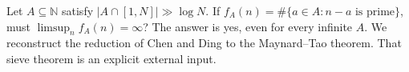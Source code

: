 Let $A\subseteq\mathbb N$ satisfy $|A\cap[1,N]|\gg\log N$.
If $f_A(n)=\#\{a\in A:n-a\text{ is prime}\}$, must
$\limsup_n f_A(n)=\infty$? The answer is yes, even for every
infinite $A$. We reconstruct the reduction of Chen and Ding
to the Maynard--Tao theorem. That sieve theorem is an explicit
external input.
